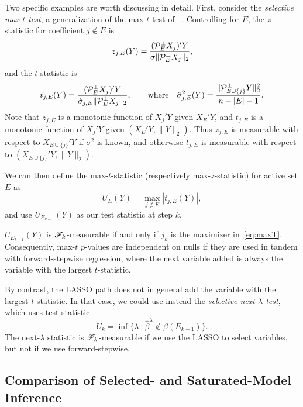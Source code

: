 \documentclass{article}
\begin{document}
Two specific examples are worth discussing in detail. First, consider the {\em selective max-$t$ test}, a generalization of the max-$t$ test of ~\citet{bujaxxxxmaxT}. Controlling for $E$, the $z$-statistic for coefficient $j\notin E$ is
\begin{equation}
  z_{j,E}(Y) = \frac{(\mathcal{P}_E^\perp X_j)'Y}
  {\sigma\|\mathcal{P}_{E}^\perp X_j\|_2},
\end{equation}
and the $t$-statistic is
\begin{equation}
  t_{j,E}(Y) = \frac{(\mathcal{P}_E^\perp X_j)'Y}
  {\hat \sigma_{j,E} \|\mathcal{P}_{E}^\perp X_j\|_2},
  \qquad \text{where} \quad 
  \hat \sigma_{j,E}^2(Y) = 
  \frac{\|\mathcal{P}_{E \cup \{j\}}^\perp Y\|_2^2}{n-|E|-1}.
\end{equation}
Note that $z_{j,E}$ is a monotonic function of $X_j'Y$ given $X_E'Y$, and $t_{j, E}$ is a monotonic function of $X_j'Y$ given $(X_E'Y, \|Y\|_2)$. Thus $z_{j,E}$ is measurable with respect 
to $X_{E \cup \{j\}}'Y$ if $\sigma^2$ is known, and otherwise $t_{j,E}$ is measurable with respect to $(X_{E \cup \{j\}}'Y, \|Y\|_2)$.

We can then define the max-$t$-statistic (respectively max-$z$-statistic) for active set $E$ as
\begin{equation}\label{eq:maxT}
  U_E(Y) = \max_{j \notin E} \left|t_{j,E}(Y)\right|,
\end{equation}
and use $U_{E_{k-1}}(Y)$ as our test statistic at step $k$.

$U_{E_{k-1}}(Y)$ is $\mathscr{F}_k$-measurable if and only if $j_k$ is the maximizer in~\eqref{eq:maxT}. Consequently, max-$t$ $p$-values are independent on nulls if they are used in tandem with forward-stepwise regression, where the next variable added is always the variable with the largest $t$-statistic.

By contrast, the LASSO path does not in general add the variable with the largest $t$-statistic. In that case, we could use instead the {\em selective next-$\lambda$ test}, which uses test statistic
\begin{equation}
  U_k = \inf\{ \lambda:\; \hat\beta^\lambda \notin \beta(E_{k-1})\}.
\end{equation}
The next-$\lambda$ statistic is $\mathscr{F}_k$-measurable if we use the LASSO to select variables, but not if we use forward-stepwise. 


\subsection{Comparison of Selected- and Saturated-Model Inference}\label{sec:bivariate}
\end{document}
